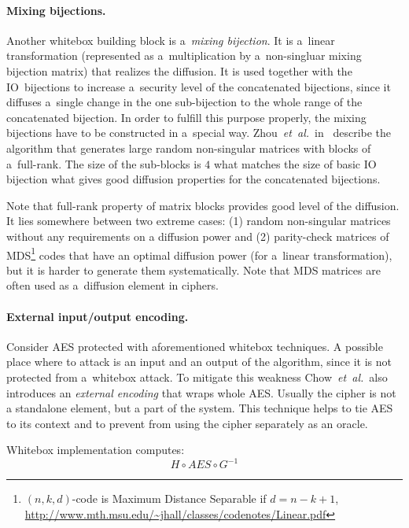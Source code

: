\documentclass[11pt,oneside,final]{fithesis2}
\newcommand{\eal}{\emph{et~al.}}
\begin{document}
    \paragraph*{Mixing bijections.}\label{sec:mixingBijections01}
    Another whitebox building block is a~\emph{mixing bijection}. It is a~linear transformation (represented as a~multiplication by a~non-singluar mixing bijection matrix)
    that realizes the diffusion. It is used together with the IO~bijections to increase a~security level of the concatenated bijections, since it diffuses a~single change
    in the one sub-bijection to the whole range of the concatenated bijection. In order to fulfill this purpose properly, the mixing bijections have to be constructed
    in a~special way. Zhou~\eal\ in~\citep{journals/iacr/XiaoZ02} describe the algorithm that generates large random non-singular matrices with blocks of a~full-rank.
    The size of the sub-blocks is $4$ what matches the size of basic IO bijection what gives good diffusion properties for the concatenated bijections. 
    
    Note that full-rank property of matrix blocks provides good level of the diffusion. It lies somewhere between two extreme cases: (1) random non-singular matrices without any
    requirements on a diffusion power and (2) parity-check matrices of MDS\footnote{$(n, k, d)$-code is Maximum Distance Separable if $d=n-k+1$, \url{http://www.mth.msu.edu/~jhall/classes/codenotes/Linear.pdf}} 
    codes that have an optimal diffusion power (for a~linear transformation), but it is harder to generate them systematically. Note that MDS matrices are often used 
    as a~diffusion element in ciphers.
    
    \paragraph*{External input/output encoding.}
    Consider AES protected with aforementioned whitebox techniques. A possible place where to attack is an input and an output of the algorithm, since it is not protected 
    from a~whitebox attack. To mitigate this weakness Chow~\eal\ also introduces an \emph{external encoding} that wraps whole AES. Usually the cipher is not a standalone element,
    but a part of the system. This technique helps to tie AES to its context and to prevent from using the cipher separately as an oracle.

    Whitebox implementation computes:
    \begin{equation}
	H \circ AES \circ G^{-1}
    \end{equation}
    
\end{document}
